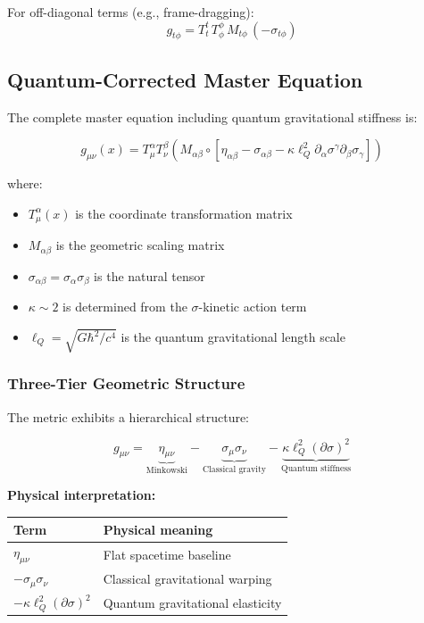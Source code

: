 \documentclass[11pt,a4paper]{article}
\theoremstyle{definition}
\theoremstyle{remark}
\begin{document}
	For off-diagonal terms (e.g., frame-dragging):
	\begin{equation}
		g_{t\phi} = T^t_t \, T^\phi_\phi \, M_{t\phi} \, (-\sigma_{t\phi})
		\label{eq:gtphi}
	\end{equation}
	
	\subsection{Quantum-Corrected Master Equation}
	
	The complete master equation including quantum gravitational stiffness is:
	
	\begin{equation}
		\boxed{g_{\mu\nu}(x) = T^\alpha_\mu T^\beta_\nu \left(M_{\alpha\beta} \circ \left[\eta_{\alpha\beta} - \sigma_{\alpha\beta} - \kappa\ell_Q^2 \partial_\alpha\sigma^\gamma \partial_\beta\sigma_\gamma\right]\right)}
		\label{eq:master_quantum}
	\end{equation}
	
	where:
	\begin{itemize}
		\item $T^\alpha_\mu(x)$ is the coordinate transformation matrix
		\item $M_{\alpha\beta}$ is the geometric scaling matrix
		\item $\sigma_{\alpha\beta} = \sigma_\alpha\sigma_\beta$ is the natural tensor
		\item $\kappa \sim 2$ is determined from the $\sigma$-kinetic action term
		\item $\ell_Q = \sqrt{G\hbar^2/c^4}$ is the quantum gravitational length scale
	\end{itemize}
	
	\subsubsection{Three-Tier Geometric Structure}
	
	The metric exhibits a hierarchical structure:
	
	\begin{equation}
		g_{\mu\nu} = \underbrace{\eta_{\mu\nu}}_{\text{Minkowski}} - \underbrace{\sigma_\mu\sigma_\nu}_{\text{Classical gravity}} - \underbrace{\kappa\ell_Q^2(\partial\sigma)^2}_{\text{Quantum stiffness}}
	\end{equation}
	
	\textbf{Physical interpretation:}
	
	\begin{table}[h]
		\centering
		\begin{tabular}{ll}
			\toprule
			Term & Physical meaning \\
			\midrule
			$\eta_{\mu\nu}$ & Flat spacetime baseline \\
			$-\sigma_\mu\sigma_\nu$ & Classical gravitational warping \\
			$-\kappa\ell_Q^2(\partial\sigma)^2$ & Quantum gravitational elasticity \\
			\bottomrule
		\end{tabular}
	\end{table}
	
\end{document}
